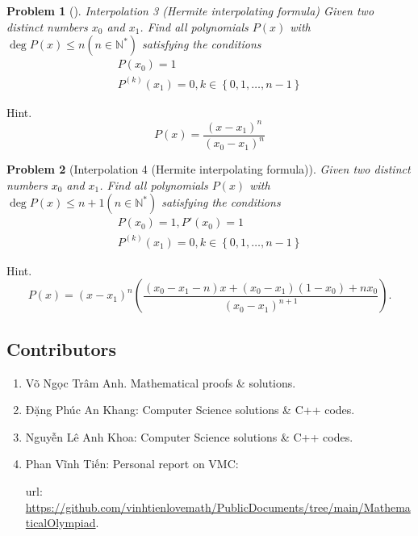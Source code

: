 \documentclass{article}
\newtheorem{problem}{Problem}
\begin{document}
\begin{problem}[]Interpolation 3 (Hermite interpolating formula)
	Given two distinct numbers $x_0$ and $x_1$. Find all polynomials $P(x)$ with $\deg P(x) \le n (n \in \mathbb{N}^{*})$ satisfying the conditions
	\begin{align}
		P\left( {{x_0}} \right) = 1\\
		{P^{\left( k \right)}}\left( {{x_1}} \right) = 0,k \in \left\{ {0,1, \ldots ,n - 1} \right\}
	\end{align}
\end{problem}
{\sf Hint.} 
\begin{equation}
	P\left( x \right) = \frac{{{{\left( {x - {x_1}} \right)}^n}}}{{{{\left( {{x_0} - {x_1}} \right)}^n}}}
\end{equation}

\begin{problem}[Interpolation 4 (Hermite interpolating formula)]
	Given two distinct numbers $x_0$ and $x_1$. Find all polynomials $P(x)$ with $\deg P(x) \le n+1 (n \in \mathbb{N}^{*})$ satisfying the conditions
	\begin{align}
		P\left( {{x_0}} \right) = 1,P'\left( {{x_0}} \right) = 1\\
		{P^{\left( k \right)}}\left( {{x_1}} \right) = 0,k \in \left\{ {0,1, \ldots ,n - 1} \right\}
	\end{align}
\end{problem}
{\sf Hint.} 
\begin{equation}
	P\left( x \right) = {\left( {x - {x_1}} \right)^n}\left( {\frac{{\left( {{x_0} - {x_1} - n} \right)x + \left( {{x_0} - {x_1}} \right)\left( {1 - {x_0}} \right) + n{x_0}}}{{{{\left( {{x_0} - {x_1}} \right)}^{n + 1}}}}} \right).
\end{equation}

\subsection{Contributors}

\begin{enumerate}
	\item {\sc Võ Ngọc Trâm Anh}. Mathematical proofs \& solutions.
	\item {\sc Đặng Phúc An Khang}: Computer Science solutions \& C++ codes.
	\item {\sc Nguyễn Lê Anh Khoa}: Computer Science solutions \& C++ codes.
	\item {\sc Phan Vĩnh Tiến}: Personal report on VMC:
	
	{\sc url}: \url{https://github.com/vinhtienlovemath/PublicDocuments/tree/main/MathematicalOlympiad}.
\end{enumerate}
\end{document}
